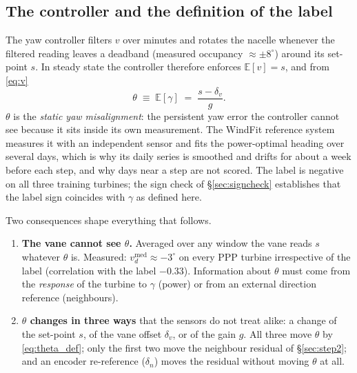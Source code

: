 \documentclass[11pt,a4paper]{article}
\theoremstyle{remark}
\newcommand{\med}{\operatorname{med}}
\newcommand{\E}{\mathbb{E}}
\newcommand{\dg}{^{\circ}}
\begin{document}
\subsection{The controller and the definition of the label}
The yaw controller filters $v$ over minutes and rotates the nacelle whenever the
filtered reading leaves a deadband (measured occupancy $\approx\pm8\dg$) around
its set-point $s$. In steady state the controller therefore enforces
$\E[v]=s$, and from \eqref{eq:v}
\begin{equation}
  \theta \;\equiv\; \E[\gamma] \;=\; \frac{s-\delta_v}{g}.
  \label{eq:theta_def}
\end{equation}
$\theta$ is the \emph{static yaw misalignment}: the persistent yaw error the
controller cannot see because it sits inside its own measurement. The WindFit
reference system measures it with an independent sensor and fits the
power-optimal heading over several days, which is why its daily series is
smoothed and drifts for about a week before each step, and why days near a step
are not scored. The label is negative on all three training turbines; the
sign check of \S\ref{sec:signcheck} establishes that the label sign coincides
with $\gamma$ as defined here.

Two consequences shape everything that follows.
\begin{enumerate}
\item \textbf{The vane cannot see $\theta$.} Averaged over any window the vane
      reads $s$ whatever $\theta$ is. Measured: $v^{\med}_d\approx-3\dg$ on
      every PPP turbine irrespective of the label (correlation with the label
      $-0.33$). Information about $\theta$ must come from the \emph{response} of
      the turbine to $\gamma$ (power) or from an external direction reference
      (neighbours).
\item \textbf{$\theta$ changes in three ways} that the sensors do not treat
      alike: a change of the set-point $s$, of the vane offset $\delta_v$, or of
      the gain $g$. All three move $\theta$ by \eqref{eq:theta_def}; only the
      first two move the neighbour residual of \S\ref{sec:step2}; and an encoder
      re-reference ($\delta_n$) moves the residual without moving $\theta$ at
      all.
\end{enumerate}
\end{document}
